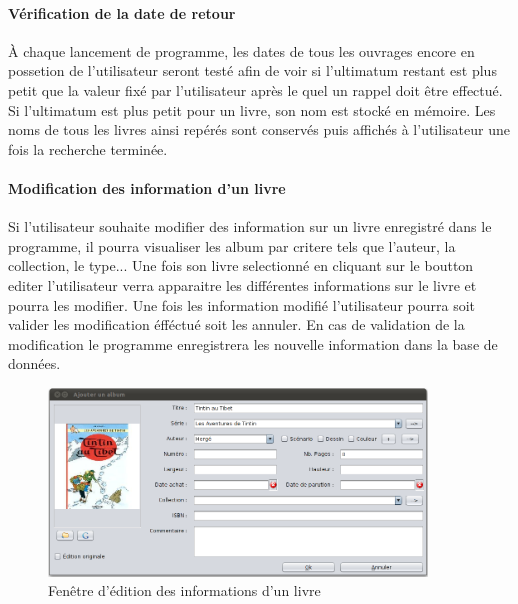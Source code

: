 

\paragraph{Vérification de la date de retour}
À chaque lancement de programme, les dates de tous les ouvrages encore en possetion de l'utilisateur seront testé afin de voir si l'ultimatum restant est plus petit que la valeur fixé par l'utilisateur après le quel un rappel doit être effectué. 
Si l'ultimatum est plus petit pour un livre, son nom est stocké en mémoire. 
Les noms de tous les livres ainsi repérés sont conservés puis affichés à l'utilisateur une fois la recherche terminée. 


\paragraph{Modification des information d'un livre}
Si l'utilisateur souhaite modifier des information sur un livre enregistré dans le programme, il pourra visualiser les album par critere tels que l'auteur, la collection, le type...
Une fois son livre selectionné en cliquant sur le boutton editer l'utilisateur verra apparaitre les différentes informations sur le livre et pourra les modifier.
Une fois les information modifié l'utilisateur pourra soit valider les modification éfféctué soit les annuler. 
En cas de validation de la modification le programme enregistrera les nouvelle information dans la base de données.  

\begin{figure}
\begin{center}
\includegraphics[height=5cm]{../img/editionAlbum.png}
\end{center}
\caption{Fenêtre d'édition des informations d'un livre}
\end{figure}
